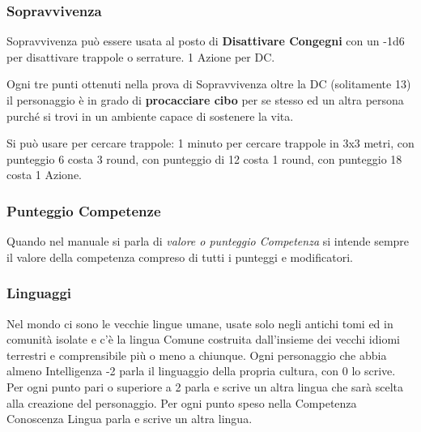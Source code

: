 \begin{multicols}{2}
\titlespacing*{\subsubsection}{0pt}{0.5em}{0.5em}\subsubsection*{Sopravvivenza}\label{sopravvivenza}

Sopravvivenza può essere usata al posto di \textbf{Disattivare Congegni} con un -1d6 per disattivare trappole o serrature. 1 Azione per DC.

Ogni tre punti ottenuti nella prova di Sopravvivenza oltre la DC (solitamente 13) il personaggio è in grado di \textbf{procacciare cibo} per se stesso ed un altra persona purché si trovi in un ambiente capace di sostenere la vita.

Si può usare per cercare trappole: 1 minuto per cercare trappole in 3x3 metri, con punteggio 6 costa 3 round, con punteggio di 12 costa 1 round, con punteggio 18 costa 1 Azione.

\subsubsection*{Punteggio Competenze}\label{Punteggio Competenze}

Quando nel manuale si parla di \emph{valore o punteggio Competenza} si intende sempre il valore della competenza compreso di tutti i punteggi e modificatori.

\titlespacing*{\subsubsection}{0pt}{0.5em}{0.5em}\subsubsection*{Linguaggi}\hypertarget{linguaggi}{}\label{linguaggi}

Nel mondo ci sono le vecchie lingue umane, usate solo negli antichi tomi ed in comunità isolate e c'è la lingua Comune costruita dall'insieme dei vecchi idiomi terrestri e comprensibile più o meno a chiunque. Ogni personaggio che abbia almeno Intelligenza -2 parla il linguaggio della propria cultura, con 0 lo scrive. Per ogni punto pari o superiore a 2 parla e scrive un altra lingua che sarà scelta alla creazione del personaggio. Per ogni punto speso nella Competenza Conoscenza Lingua parla e scrive un altra lingua.


\end{multicols}
